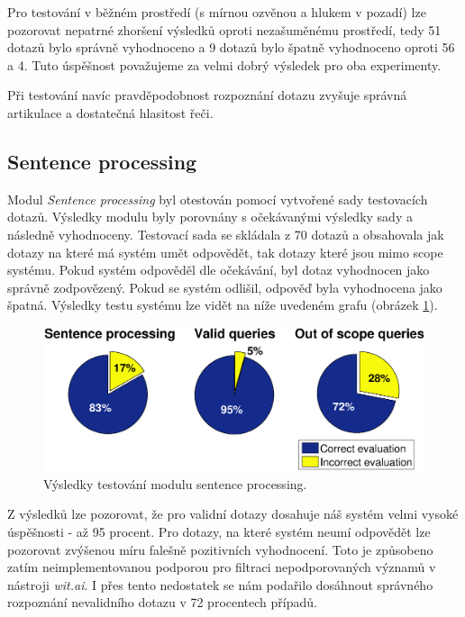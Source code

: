 \documentclass[12pt,a4paper]{article}
\begin{document}
Pro testování v běžném prostředí (s mírnou ozvěnou a hlukem v pozadí) lze pozorovat nepatrné zhoršení výsledků oproti nezašuměnému prostředí, tedy 51 dotazů bylo správně vyhodnoceno a 9 dotazů bylo špatně vyhodnoceno oproti 56 a 4. 
Tuto úspěšnost považujeme za velmi dobrý výsledek pro oba experimenty.

Při testování navíc pravděpodobnost rozpoznání dotazu zvyšuje správná artikulace a dostatečná hlasitost řeči. 

\subsection{Sentence processing}
Modul \textit{Sentence processing} byl otestován pomocí vytvořené sady testovacích dotazů. Výsledky modulu byly porovnány s očekávanými výsledky sady a následně vyhodnoceny.
Testovací sada se skládala z 70 dotazů a obsahovala jak dotazy na které má systém umět odpovědět, tak dotazy které jsou mimo scope systému. Pokud systém odpověděl dle očekávání, byl dotaz vyhodnocen jako správně zodpovězený. Pokud se systém odlišil, odpověď byla vyhodnocena jako špatná. Výsledky testu systému lze vidět na níže uvedeném grafu (obrázek \ref{fig:sentence_processing}).

\begin{figure}[ht]
	\begin{center}
		\includegraphics[width = 1\textwidth ]{sentence.eps}
		\caption{Výsledky testování modulu sentence processing.}
		\label{fig:sentence_processing}
	\end{center}
\end{figure}

Z výsledků lze pozorovat, že pro validní dotazy dosahuje náš systém velmi vysoké úspěšnosti - až 95 procent. Pro dotazy, na které systém neumí odpovědět lze pozorovat zvýšenou míru falešně pozitivních vyhodnocení. Toto je způsobeno zatím neimplementovanou podporou pro filtraci nepodporovaných významů v nástroji \textit{wit.ai}. I přes tento nedostatek se nám podařilo dosáhnout správného rozpoznání nevalidního dotazu v 72 procentech případů.
\end{document}
